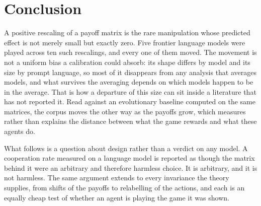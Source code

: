\documentclass[openacc]{rsproca_new}
\begin{document}
\section{Conclusion}\label{sec:conclusion}

A positive rescaling of a payoff matrix is the rare manipulation whose
predicted effect is not merely small but exactly zero. Five frontier language
models were played across ten such rescalings, and every one of them moved. The
movement is not a uniform bias a calibration could absorb: its shape differs by
model and its size by prompt language, so most of it disappears from any
analysis that averages models, and what survives the averaging depends on which
models happen to be in the average. That is how a departure of this size can
sit inside a literature that has not reported it. Read against an evolutionary
baseline computed on the same matrices, the corpus moves the other way as the
payoffs grow, which measures rather than explains the distance between what the
game rewards and what these agents do.

What follows is a question about design rather than a verdict on any model. A
cooperation rate measured on a language model is reported as though the matrix
behind it were an arbitrary and therefore harmless choice. It is arbitrary, and
it is not harmless. The same argument extends to every invariance the theory
supplies, from shifts of the payoffs to relabelling of the actions, and each is
an equally cheap test of whether an agent is playing the game it was shown.




\end{document}
